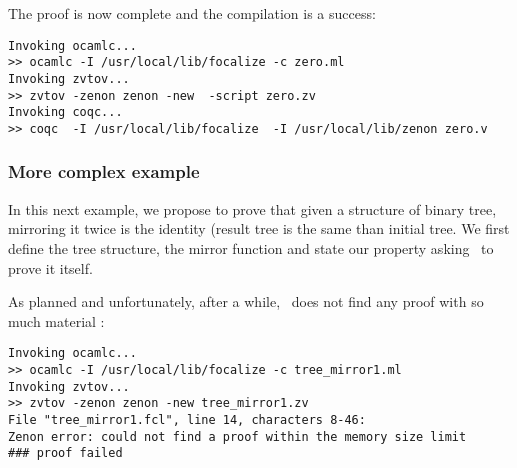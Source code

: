 \documentclass[11pt,a4paper,twoside,onecolumn,fullpage]{article}
\begin{document}
The proof is now complete and the compilation is a success:

{\scriptsize
\begin{verbatim}
Invoking ocamlc...
>> ocamlc -I /usr/local/lib/focalize -c zero.ml
Invoking zvtov...
>> zvtov -zenon zenon -new  -script zero.zv
Invoking coqc...                                                
>> coqc  -I /usr/local/lib/focalize  -I /usr/local/lib/zenon zero.v
\end{verbatim}}


\subsubsection{More complex example}
In this next example, we propose to prove that given a structure of binary
tree, mirroring it twice is the identity (result tree is the same than
initial tree. We first define the tree structure, the mirror function
and state our property asking \zenon\ to prove it itself.

{\scriptsize
}

\noindent As planned and unfortunately, after a while, \zenon\ does not find any
proof with so much material :

{\scriptsize
\begin{verbatim}
Invoking ocamlc...
>> ocamlc -I /usr/local/lib/focalize -c tree_mirror1.ml
Invoking zvtov...
>> zvtov -zenon zenon -new tree_mirror1.zv
File "tree_mirror1.fcl", line 14, characters 8-46:              
Zenon error: could not find a proof within the memory size limit
### proof failed
\end{verbatim}}

\end{document}
